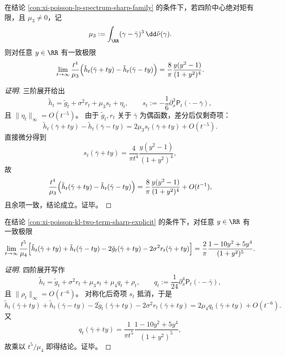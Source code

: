 \begin{conclusion}[反对称剖面分离三阶中心矩]\label{con:xi-poisson-antisymmetric-profile-mu3}
在结论 \ref{con:xi-poisson-lp-spectrum-sharp-family} 的条件下，若四阶中心绝对矩有限，且 \(\mu_3\neq 0\)，记
\[
\mu_3:=\int_{\RR}(\gamma-\bar\gamma)^3\,\dd\tilde\nu(\gamma).
\]
则对任意 \(y\in\RR\) 有一致极限
\[
\lim_{t\to\infty}
\frac{t^4}{\mu_3}
\Bigl(\tilde h_t(\bar\gamma+ty)-\tilde h_t(\bar\gamma-ty)\Bigr)
=\frac{8}{\pi}\frac{y(y^2-1)}{(1+y^2)^4}.
\]
\end{conclusion}
\begin{proof}[证明]
三阶展开给出
\[
\tilde h_t=\tilde g_t+\sigma^2 r_t+\mu_3 s_t+\eta_t,\qquad
s_t:=-\frac16\partial_x^3\mathsf P_t(\cdot-\bar\gamma),
\]
且 \(\|\eta_t\|_\infty=O(t^{-5})\)。
由于 \(\tilde g_t,r_t\) 关于 \(\bar\gamma\) 为偶函数，差分后仅剩奇项：
\[
\tilde h_t(\bar\gamma+ty)-\tilde h_t(\bar\gamma-ty)
=2\mu_3 s_t(\bar\gamma+ty)+O(t^{-5}).
\]
直接微分得到
\[
s_t(\bar\gamma+ty)=\frac{4}{\pi t^4}\frac{y(y^2-1)}{(1+y^2)^4},
\]
故
\[
\frac{t^4}{\mu_3}\Bigl(\tilde h_t(\bar\gamma+ty)-\tilde h_t(\bar\gamma-ty)\Bigr)
=\frac{8}{\pi}\frac{y(y^2-1)}{(1+y^2)^4}+O(t^{-1}),
\]
且余项一致，结论成立。证毕。
\end{proof}

\begin{conclusion}[对称残差分离四阶中心矩]\label{con:xi-poisson-symmetric-residual-mu4}
在结论 \ref{con:xi-poisson-kl-two-term-sharp-explicit} 的条件下，对任意 \(y\in\RR\) 有一致极限
\[
\lim_{t\to\infty}\frac{t^5}{\mu_4}
\Bigl[
\tilde h_t(\bar\gamma+ty)+\tilde h_t(\bar\gamma-ty)
-2\tilde g_t(\bar\gamma+ty)-2\sigma^2 r_t(\bar\gamma+ty)
\Bigr]
=\frac{2}{\pi}\frac{1-10y^2+5y^4}{(1+y^2)^5}.
\]
\end{conclusion}
\begin{proof}[证明]
四阶展开写作
\[
\tilde h_t=\tilde g_t+\sigma^2 r_t+\mu_3 s_t+\mu_4 q_t+\rho_t,\qquad
q_t:=\frac{1}{24}\partial_x^4\mathsf P_t(\cdot-\bar\gamma),
\]
且 \(\|\rho_t\|_\infty=O(t^{-6})\)。
对称化后奇项 \(s_t\) 抵消，于是
\[
\tilde h_t(\bar\gamma+ty)+\tilde h_t(\bar\gamma-ty)-2\tilde g_t(\bar\gamma+ty)-2\sigma^2 r_t(\bar\gamma+ty)
=2\mu_4 q_t(\bar\gamma+ty)+O(t^{-6}).
\]
又
\[
q_t(\bar\gamma+ty)=\frac{1}{\pi t^5}\frac{1-10y^2+5y^4}{(1+y^2)^5},
\]
故乘以 \(t^5/\mu_4\) 即得结论。证毕。
\end{proof}

